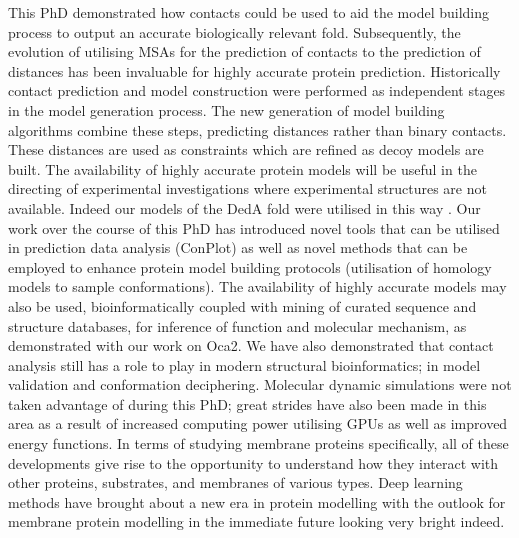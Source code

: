 This PhD demonstrated how contacts could be used to aid the model building process to output an accurate biologically relevant fold. Subsequently, the evolution of utilising MSAs for the prediction of contacts to the prediction of distances has been invaluable for highly accurate protein prediction.  Historically contact prediction and model construction were performed as independent stages in the model generation process. The new generation of model building algorithms combine these steps, predicting distances rather than binary contacts.  These distances are used as constraints which are refined as decoy models are built.  The availability of highly accurate protein models will be useful in the directing of experimental investigations where experimental structures are not available.  Indeed our models of the DedA fold were utilised in this way \cite{tiwari2021klebsiella,chen2022scramblases,scarsbrook2021topological,hama2022regulation}.  Our work over the course of this PhD has introduced novel tools that can be utilised in prediction data analysis (ConPlot) as well as novel methods that can be employed to enhance protein model building protocols (utilisation of homology models to sample conformations).  The availability of highly accurate models may also be used, bioinformatically coupled with mining of curated sequence and structure databases, for inference of function and molecular mechanism, as demonstrated with our work on Oca2. We have also demonstrated that contact analysis still has a role to play in modern structural bioinformatics; in model validation and conformation deciphering. Molecular dynamic simulations were not taken advantage of during this PhD; great strides have also been made in this area as a result of increased computing power utilising GPUs as well as improved energy functions.  In terms of studying membrane proteins specifically, all of these developments give rise to the opportunity to understand how they interact with other proteins, substrates, and membranes of various types. Deep learning methods have brought about a new era in protein modelling with the outlook for membrane protein modelling in the immediate future looking very bright indeed. 



